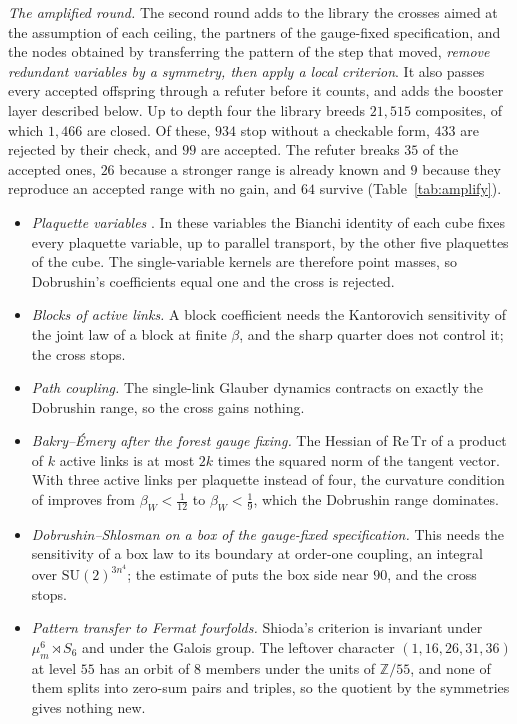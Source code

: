 \emph{The amplified round.} The second round adds to the library the crosses aimed at the assumption of each ceiling, the partners of the gauge-fixed specification, and the nodes obtained by transferring the pattern of the step that moved, \emph{remove redundant variables by a symmetry, then apply a local criterion}. It also passes every accepted offspring through a refuter before it counts, and adds the booster layer described below. Up to depth four the library breeds $21{,}515$ composites, of which $1{,}466$ are closed. Of these, $934$ stop without a checkable form, $433$ are rejected by their check, and $99$ are accepted. The refuter breaks $35$ of the accepted ones, $26$ because a stronger range is already known and $9$ because they reproduce an accepted range with no gain, and $64$ survive (Table~\ref{tab:amplify}).
\begin{itemize}[leftmargin=*,itemsep=1pt]
\item \emph{Plaquette variables} \cite{Bat82}. In these variables the Bianchi identity of each cube fixes every plaquette variable, up to parallel transport, by the other five plaquettes of the cube. The single-variable kernels are therefore point masses, so Dobrushin's coefficients equal one and the cross is rejected.
\item \emph{Blocks of active links.} A block coefficient needs the Kantorovich sensitivity of the joint law of a block at finite $\beta$, and the sharp quarter does not control it; the cross stops.
\item \emph{Path coupling.} The single-link Glauber dynamics contracts on exactly the Dobrushin range, so the cross gains nothing.
\item \emph{Bakry--\'Emery after the forest gauge fixing.} The Hessian of $\mathrm{Re}\,\mathrm{Tr}$ of a product of $k$ active links is at most $2k$ times the squared norm of the tangent vector. With three active links per plaquette instead of four, the curvature condition of \cite{SZZ23} improves from $\beta_{W}<\frac1{12}$ to $\beta_{W}<\frac19$, which the Dobrushin range dominates.
\item \emph{Dobrushin--Shlosman on a box of the gauge-fixed specification.} This needs the sensitivity of a box law to its boundary at order-one coupling, an integral over $\mathrm{SU}(2)^{3n^{4}}$; the estimate of \cite{BB26d} puts the box side near $90$, and the cross stops.
\item \emph{Pattern transfer to Fermat fourfolds.} Shioda's criterion is invariant under $\mu_{m}^{6}\rtimes S_{6}$ and under the Galois group. The leftover character $(1,16,26,31,36)$ at level $55$ has an orbit of $8$ members under the units of $\mathbb{Z}/55$, and none of them splits into zero-sum pairs and triples, so the quotient by the symmetries gives nothing new.

\end{itemize}
